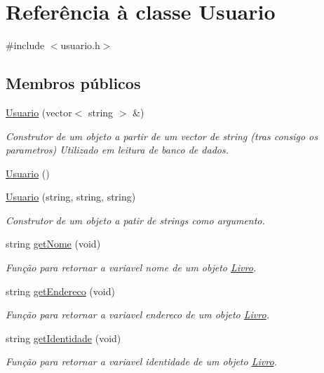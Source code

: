 \hypertarget{class_usuario}{}\section{Referência à classe Usuario}
\label{class_usuario}


{\ttfamily \#include $<$usuario.\+h$>$}

\subsection*{Membros públicos}
\begin{DoxyCompactItemize}
\item 
\hyperlink{class_usuario_ab7216c2b4c492cc70cd1e06c3f446e68}{Usuario} (vector$<$ string $>$ \&)
\begin{DoxyCompactList}\small\item\em Construtor de um objeto a partir de um vector de string (tras consigo os parametros) Utilizado em leitura de banco de dados. \end{DoxyCompactList}\item 
\hyperlink{class_usuario_aa85a5371a098dfba5449140d9b8a472f}{Usuario} ()
\item 
\hyperlink{class_usuario_a2e852e0e375bc99e6810fd1919353464}{Usuario} (string, string, string)
\begin{DoxyCompactList}\small\item\em Construtor de um objeto a patir de strings como argumento. \end{DoxyCompactList}\item 
string \hyperlink{class_usuario_a160dc8cfe61406cc2935d0e529d3ed07}{get\+Nome} (void)
\begin{DoxyCompactList}\small\item\em Função para retornar a variavel nome de um objeto \hyperlink{class_livro}{Livro}. \end{DoxyCompactList}\item 
string \hyperlink{class_usuario_a645fe3fa619ca57849ef5ea442caeaf5}{get\+Endereco} (void)
\begin{DoxyCompactList}\small\item\em Função para retornar a variavel endereco de um objeto \hyperlink{class_livro}{Livro}. \end{DoxyCompactList}\item 
string \hyperlink{class_usuario_a3869f68ef41f4574c86a286d6d482ad0}{get\+Identidade} (void)
\begin{DoxyCompactList}\small\item\em Função para retornar a variavel identidade de um objeto \hyperlink{class_livro}{Livro}. \end{DoxyCompactList}\item 

\end{DoxyCompactItemize}
